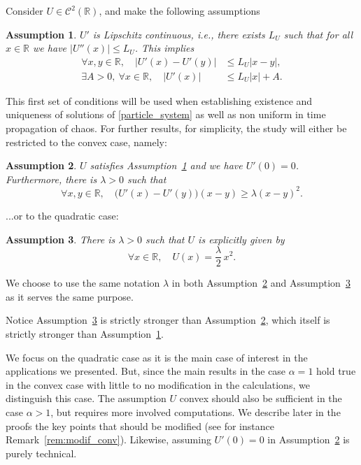 \documentclass[11pt]{article}
\newcommand{\ie}{i.e.,\xspace}
\theoremstyle{plain}
\newtheorem{assumption}{Assumption}
\theoremstyle{definition}
\begin{document}
Consider $U\in\mathcal{C}^2(\mathbb{R})$, and make the following assumptions
\begin{assumption}\label{Hyp_U_lip}
$U'$ is Lipschitz continuous, \ie there exists $L_U$ such that for all $x\in\mathbb{R}$ we have $\left|U''(x)\right|\leq L_U$. This implies\vspace*{-3pt}
\begin{align*}
\forall x,y\in\mathbb{R},\quad \left|U'(x)-U'(y)\right|&\leq L_U|x-y|,
\\
\tag*{and}
\exists A>0,\ \forall x\in\mathbb{R},\quad \left|U'(x)\right|&\leq L_U| x|+A.
\end{align*}
\end{assumption}
This first set of conditions will be used when establishing existence and uniqueness of solutions of \eqref{particle_system} as well as non uniform in time propagation of chaos. For further results, for simplicity, the study will either be restricted to the convex case, namely:

\begin{assumption}\label{Hyp_U_conv}$U$ satisfies Assumption~\ref{Hyp_U_lip} and we have $U'(0)=0$. Furthermore,
there is $\lambda>0$ such that\vspace*{-3pt}
\[
\forall x,y\in\mathbb{R},\quad \bigl(U'(x)-U'(y)\bigr)(x-y)\geq \lambda(x-y)^2.
\]
\end{assumption}
\noindent
...or to the quadratic case:
\begin{assumption}\label{Hyp_U_quad}
There is $\lambda>0$ such that $U$ is explicitly given by\vspace*{-3pt}
\[
\forall x\in\mathbb{R},\quad U(x)=\frac{\lambda}{2}\,x^2.
\]
\end{assumption}
We choose to use the same notation $\lambda$ in both Assumption~\ref{Hyp_U_conv} and Assumption~\ref{Hyp_U_quad} as it serves the same purpose.

Notice Assumption~\ref{Hyp_U_quad} is strictly stronger than Assumption~\ref{Hyp_U_conv}, which itself is strictly stronger than Assumption~\ref{Hyp_U_lip}.

We focus on the quadratic case as it is the main case of interest in the applications we presented. But, since the main results in the case $\alpha=1$ hold true in the convex case with little to no modification in the calculations, we distinguish this case. The assumption $U$ convex should also be sufficient in the case $\alpha>1$, but requires more involved computations. We describe later in the proofs the key points that should be modified (see for instance Remark~\ref{rem:modif_conv}). Likewise, assuming $U'(0)=0$ in Assumption~\ref{Hyp_U_conv} is purely technical.
\end{document}
